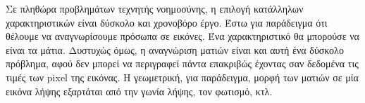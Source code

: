     Σε πληθώρα προβλημάτων τεχνητής νοημοσύνης, η επιλογή κατάλληλων χαρακτηριστικών
    είναι δύσκολο και χρονοβόρο έργο. Έστω για παράδειγμα ότι θέλουμε να αναγνωρίσουμε
    πρόσωπα σε εικόνες. Ένα χαρακτηριστικό θα μπορούσε να είναι τα μάτια. Δυστυχώς όμως,
    η αναγνώριση ματιών είναι και αυτή ένα δύσκολο πρόβλημα, αφού δεν μπορεί να
    περιγραφεί πάντα επακριβώς έχοντας σαν δεδομένα τις τιμές των pixel της εικόνας.
    Η γεωμετρική, για παράδειγμα, μορφή των ματιών σε μία εικόνα λήψης εξαρτάται από την
    γωνία λήψης, τον φωτισμό, κτλ.


    
    

